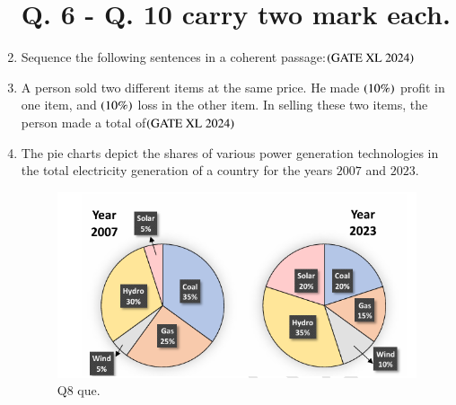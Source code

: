 \documentclass[journal]{IEEEtran}
\begin{document}
\begin{enumerate}
\section*{Q. 6 - Q. 10 carry two mark each.} 
    \item Sequence the following sentences in a coherent passage:\hfill $\left(\text{GATE XL 2024}\right)$
    \begin{enumerate}
    \end{enumerate}

    \item A person sold two different items at the same price. He made $\left(10\%\right)$ profit in one item, and $\left(10\%\right)$ loss in the other item. In selling these two items, the person made a total of\hfill $\left(\text{GATE XL 2024}\right)$
    \begin{enumerate}
    \end{enumerate}

    \item The pie charts depict the shares of various power generation technologies in the total electricity generation of a country for the years $2007$ and $2023$.

    \begin{figure}[H]
        \centering
        \includegraphics[width=0.8\columnwidth]{figs/xl2024_q8_que.png}
        \caption{Q8 que.}
    \end{figure}


\end{enumerate}
\end{document}
